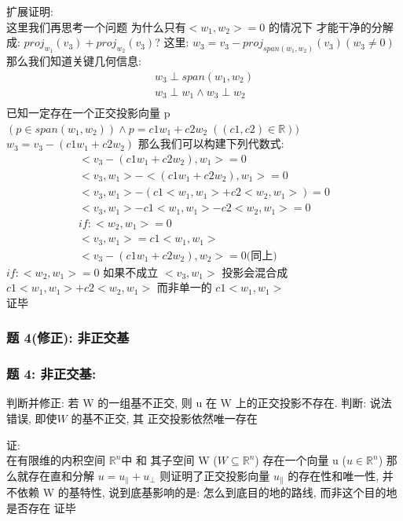 \documentclass[12pt]{article}
\begin{document}
\begin{flushleft}
    扩展证明: \\
    这里我们再思考一个问题 为什么只有$ <w_{1},w_{2}> = 0$ 的情况下 才能干净的分解成: $proj_{w_{1}}(v_{3}) + proj_{w_{2}}(v_{3})$?
    这里: $w_{3} =  v_{3} - proj_{span(w_{1},w_{2})}(v_{3}) (w_{3} \neq 0)$ \\
    那么我们知道关键几何信息:
    \begin{align}
        w_{3} \perp span(w_{1}, w_{2})            \\
        w_{3} \perp w_{1} \land w_{3} \perp w_{2} \\
    \end{align}
    已知一定存在一个正交投影向量 p $(p \in span(w_{1},w_{2})) \land p = c1w_{1} + c2w_{2} \;({(c1,c2) \in \mathbb{R}}))$ \\
    $w_{3} = v_{3} - (c1w_{1} + c2w_{2})$
    那么我们可以构建下列代数式: \\
    \begin{align}
        <v_{3} - (c1w_{1} + c2w_{2}),  w_{1}> = 0                \\
        <v_{3},w_{1}> - <(c1w_{1} + c2w_{2}),w_{1}> = 0          \\
        <v_{3},w_{1}>  - (c1<w_{1},w_{1}> + c2<w_{2},w_{1}>) = 0 \\
        <v_{3},w_{1}>  - c1<w_{1},w_{1}> - c2<w_{2},w_{1}> = 0   \\
        if: <w_{2},w_{1}> = 0                                    \\
        <v_{3},w_{1}>  =  c1<w_{1},w_{1}>                        \\
        <v_{3} - (c1w_{1} + c2w_{2}),  w_{2}> = 0 \text{(同上)}
    \end{align}
    $ if: <w_{2},w_{1}> = 0 $ 如果不成立 $<v_{3},w_{1}>$ 投影会混合成 $c1<w_{1},w_{1}> + c2<w_{2},w_{1}>$ 而非单一的 $c1<w_{1},w_{1}>$ \\
    证毕
\end{flushleft}


\begin{flushleft}
    \subsubsection{题 4(修正): 非正交基}
    \subsubsection{题 4: 非正交基:}
    判断并修正: 若 W 的一组基不正交, 则 u 在 W 上的正交投影不存在.
    判断: 说法错误, 即使$W$ 的基不正交, 其 正交投影依然唯一存在

    证: \\
    在有限维的内积空间 $\mathbb{R}^n$中 和 其子空间 W ($W \subseteq \mathbb{R}^n$)
    存在一个向量 u ($u \in \mathbb{R}^n$)
    那么就存在直和分解 $u = u_{\parallel} + u_{\perp}$
    则证明了正交投影向量 $u_{\parallel}$ 的存在性和唯一性, 并不依赖 W 的基特性, 说到底基影响的是: 怎么到底目的地的路线, 而非这个目的地是否存在
    证毕
\end{flushleft}
\end{document}
